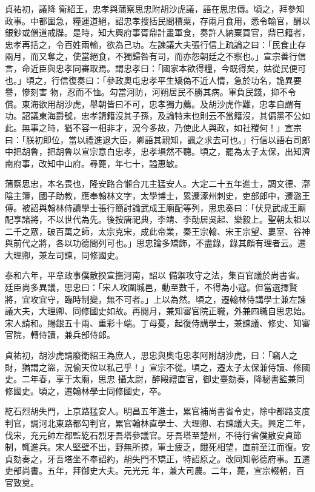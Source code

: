 \begin{pinyinscope}
 貞祐初，議降
 衛紹王，忠孝與蒲察思忠附胡沙虎議，語在思忠傳。頃之，拜參知政事。中都圍急，糧運道絕，詔忠孝搜括民間積粟，存兩月食用，悉令輸官，酬以銀鈔或僧道戒牒。是時，知大興府事胥鼎計畫軍食，奏許人納粟買官，鼎已籍者，忠孝再括之，令百姓兩輸，欲為己功。左諫議大夫張行信上疏論之曰：「民食止存兩月，而又奪之，使當絕食，不獨歸咎有司，而亦怨朝廷之不察也。」宣宗善行信言，命近臣與忠孝同審取焉。謂忠孝曰：「國家本欲得糧，今既得矣，姑從民便可也。」頃之，行信復奏曰：「參政奧屯忠孝平生矯偽不近人情，急於功名，詭異要譽，慘刻害
 物，忍而不恤。勾當河防，河朔居民不勝其病。軍負民錢，抑不令償。東海欲用胡沙虎，舉朝皆曰不可，忠孝獨力薦。及胡沙虎作難，忠孝自謂有功。詔議東海爵號，忠孝請籍沒其子孫，及論特末也則云不當籍沒，其偏黨不公如此。無事之時，猶不容一相非才，況今多故，乃使此人與政，如社稷何！」宣宗曰：「朕初即位，當以禮進退大臣，卿語其親知，諷之求去可也。」行信以語右司郎中把胡魯，把胡魯以宣宗意白忠孝，忠孝塤然不聽。頃之，罷為太子太保，出知濟南府事，改知中山府。尋薨，年七十，謚惠敏。



 蒲察思忠，本名畏也，隆安路合懶合兀主猛安人。大定二十五年進士，調文德、漷陰主簿，國子助教，應奉翰林文字，太學博士，累遷涿州刺史，吏部郎中，遷潞王傅。被詔與翰林侍讀學士張行簡討論武成王廟配等列，思忠奏曰：「伏見武成王廟配享諸將，不以世代為先。後按唐祀典，李靖、李勣居吳起、樂毅上。聖朝太祖以二千之眾，破百萬之師，太宗克宋，成此帝業，秦王宗翰、宋王宗望、婁室、谷神與前代之將，各以功德間列可也。」思忠論多矯飾，不盡錄，錄其頗有理者云。遷大理卿，兼左司諫，同修國史。



 泰和六年，平章政事僕散揆宣撫河南，詔以
 備禦攻守之法，集百官議於尚書省。廷臣尚多異議，思忠曰：「宋人攻圍城邑，動至數千，不得為小寇。但當選擇賢將，宜攻宜守，臨時制變，無不可者。」上以為然。頃之，遷翰林侍講學士兼左諫議大夫，大理卿、同修國史如故。再閱月，兼知審官院正職，外兼四職自思忠始。宋人請和。賜銀五十兩、重彩十端。丁母憂，起復侍講學士，兼諫議、修史、知審官院，轉侍讀，兼兵部侍郎。



 貞祐初，胡沙虎請廢衛紹王為庶人，思忠與奧屯忠孝阿附胡沙虎，曰：「竊人之財，猶謂之盜，況偷天位以私己乎！」宣宗不從。頃之，遷太子太保兼侍讀、修國史。二年春，享于太廟，思忠
 攝太尉，醉毆禮直官，御史臺劾奏，降秘書監兼同修國史。頃之，遷翰林學士同修國史，卒。



 紇石烈胡失門，上京路猛安人。明昌五年進士，累官補尚書省令史，除中都路支度判官，調河北東路都勾判官，累官翰林直學士、大理卿、右諫議大夫。興定二年，伐宋，充元帥左都監紇石烈牙吾塔參議官。牙吾塔至楚州，不待行省僕散安貞節制，輒進兵。宋人堅壁不出，野無所掠，軍士疲乏，餓死相望，直前至江而復。安貞劾奏之，牙吾塔坐不奉詔約，胡失門不矯正，特詔原之。改同知彰德府事。五遷吏部尚書。五年，拜御史大夫。元光元
 年，兼大司農。二年，薨，宣宗輟朝，百官致奠。




\end{pinyinscope}

